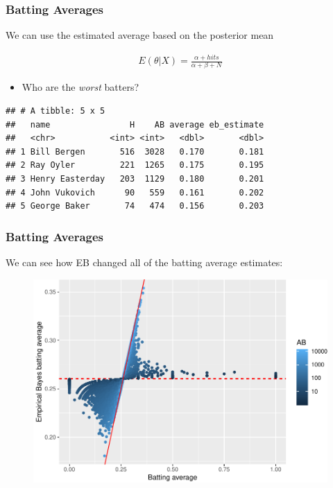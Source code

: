 \documentclass[
  shownotes,
  xcolor={svgnames},
  hyperref={colorlinks,citecolor=DarkBlue,linkcolor=DarkRed,urlcolor=DarkBlue}
  ]{beamer}
\begin{document}
\begin{frame}[fragile]
\frametitle{Batting Averages}

We can use the estimated average based on the posterior mean

\begin{align}
E(\theta|X)=\frac{\alpha+hits}{\alpha+\beta+N}
\end{align}


\begin{itemize}
\item Who are the \emph{worst} batters?
\end{itemize}
\begin{footnotesize}
\begin{verbatim}
## # A tibble: 5 x 5
##   name                H    AB average eb_estimate
##   <chr>           <int> <int>   <dbl>       <dbl>
## 1 Bill Bergen       516  3028   0.170       0.181
## 2 Ray Oyler         221  1265   0.175       0.195
## 3 Henry Easterday   203  1129   0.180       0.201
## 4 John Vukovich      90   559   0.161       0.202
## 5 George Baker       74   474   0.156       0.203
\end{verbatim}
\end{footnotesize}

\end{frame}
\begin{frame}[fragile]
\frametitle{Batting Averages}

We can see how EB changed all of the batting average estimates:

\begin{figure}[H] \centering
  \centering
  \includegraphics[scale=0.5]{figures/shrinkage_averages}
  \\
  \tiny 
\end{figure}



\end{frame}
\end{document}

